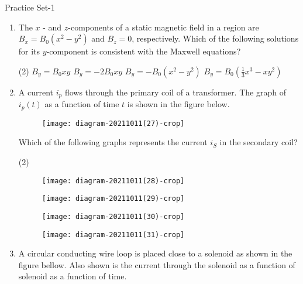 \newpage
\begin{abox}
	Practice Set-1
\end{abox}
\begin{enumerate}
	\item The $x$ - and $z$-components of a static magnetic field in a region are $B_{x}=B_{0}\left(x^{2}-y^{2}\right)$ and $B_{z}=0$, respectively. Which of the following solutions for its $y$-component is consistent with the Maxwell equations?
	{}
	\begin{tasks}(2)
		\task[\textbf{a.}]$B_{y}=B_{0} x y$
		\task[\textbf{b.}]$B_{y}=-2 B_{0} x y$
		\task[\textbf{c.}] $B_{y}=-B_{0}\left(x^{2}-y^{2}\right)$
		\task[\textbf{d.}]  $B_{y}=B_{0}\left(\frac{1}{3} x^{3}-x y^{2}\right)$
	\end{tasks}
	\item A current $i_{p}$ flows through the primary coil of a transformer. The graph of $i_{p}(t)$ as a function of time $t$ is shown in the figure below.\\
	\begin{figure}[H]
		\centering
		\texttt{[image: diagram-20211011(27)-crop]}
	\end{figure}
	Which of the following graphs represents the current $i_{S}$ in the secondary coil?
	{}
	\begin{tasks}(2)
		\task[\textbf{A.}] \begin{figure}[H]
			\centering
			\texttt{[image: diagram-20211011(28)-crop]}
		\end{figure}
		\task[\textbf{B.}] \begin{figure}[H]
			\centering
			\texttt{[image: diagram-20211011(29)-crop]}
		\end{figure}
		\task[\textbf{C.}] \begin{figure}[H]
			\centering
			\texttt{[image: diagram-20211011(30)-crop]}
		\end{figure}
		\task[\textbf{D.}] \begin{figure}[H]
			\centering
			\texttt{[image: diagram-20211011(31)-crop]}
		\end{figure}
	\end{tasks}
	\item A circular conducting wire loop is placed close to a solenoid as shown in the figure bellow. Also shown is the current through the solenoid as a function of solenoid as a function of time.\\

\end{enumerate}
